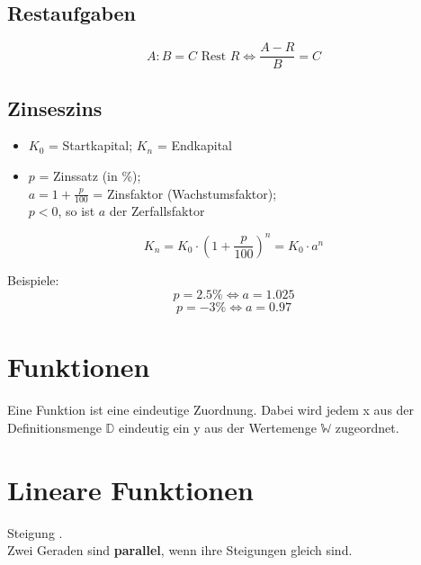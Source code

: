 \begin{multicols}{2}

\subsection*{Restaufgaben}
$$A:B = C \textrm{ Rest } R \Leftrightarrow{}\frac{A-R}B=C$$


\subsection*{Zinseszins}
\begin{itemize}
\item $K_0$ = Startkapital; $K_n$ = Endkapital
\item $p$ = Zinssatz (in \%);\\ $a = 1+\frac{p}{100}$ = Zinsfaktor
(Wachstumsfaktor);\\ $p<0$, so ist $a$ der Zerfallsfaktor
\end{itemize}
$$K_n = K_0 \cdot{} \left( 1+\frac{p}{100} \right)^n = K_0\cdot{}a^n$$

Beispiele:
$$p = 2.5\% \Longleftrightarrow{} a = 1.025$$
$$p = -3\% \Longleftrightarrow{}  a = 0.97 $$


\forceCB
\section*{Funktionen}

Eine Funktion ist eine {\color{red} eindeutige Zuordnung}. Dabei wird jedem {\color{FarnFarbe}x} aus der {\color{FarnFarbe}Definitionsmenge $\mathbb{D}$} eindeutig ein {\color{blue}y} aus der {\color{blue}Wertemenge $\mathbb{W}$} zugeordnet.



\hrulefill
\section*{Lineare Funktionen}


Steigung .\\
Zwei Geraden sind \textbf{parallel}, wenn ihre Steigungen gleich sind.


\end{multicols}
